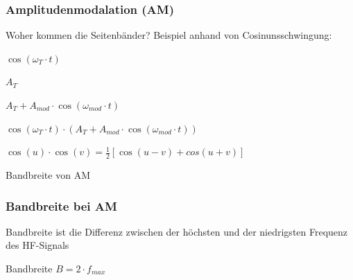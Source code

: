 \begin{frame}
	\frametitle{Amplitudenmodalation (AM)}
    \begin{exampleblock}{Woher kommen die Seitenbänder? Beispiel anhand von Cosinunsschwingung:}
        \begin{description}
            \item<1->[Trägersignal:] $\cos(\omega_T\cdot t)$
            \item<2->[Gleichanteil:] $A_T$
            \item<3->[Modulierendes Signal:] $A_T + A_{mod} \cdot \cos(\omega_{mod}\cdot t)$
            \item<4->[Resultierendes Signal:] $\cos(\omega_T \cdot t) \cdot \left( A_T + A_{mod} \cdot \cos(\omega_{mod} \cdot t) \right)$
            \item<5->[Trigonometrische Identität:] $\cos(u) \cdot \cos(v) = \frac{1}{2}\left[\cos(u-v) + cos(u+v)\right]$
        \end{description}
        \vspace{0.25cm}
    \end{exampleblock}
\end{frame}


\begin{frame}{Bandbreite von AM}
    \frametitle{Bandbreite bei AM}
    \begin{center}
    \end{center}
    Bandbreite ist die Differenz zwischen der höchsten und der niedrigsten Frequenz des HF-Signals
    \begin{block}{Bandbreite}
        {$B = 2 \cdot f_{max}$}
    \end{block}
\end{frame}

